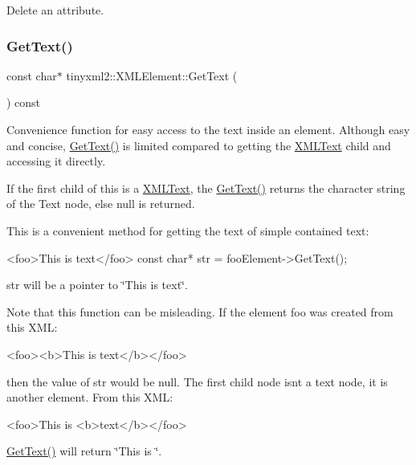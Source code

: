 Delete an attribute. \mbox{\label{classtinyxml2_1_1XMLElement_a6d5c8d115561ade4e4456b71d91b6f51}} 
\subsubsection{\texorpdfstring{GetText()}{GetText()}}
{\footnotesize\ttfamily const char$\ast$ tinyxml2\+::\+X\+M\+L\+Element\+::\+Get\+Text (\begin{DoxyParamCaption}{ }\end{DoxyParamCaption}) const}

Convenience function for easy access to the text inside an element. Although easy and concise, \mbox{\hyperlink{classtinyxml2_1_1XMLElement_a6d5c8d115561ade4e4456b71d91b6f51}{Get\+Text()}} is limited compared to getting the \mbox{\hyperlink{classtinyxml2_1_1XMLText}{X\+M\+L\+Text}} child and accessing it directly.

If the first child of \textquotesingle{}this\textquotesingle{} is a \mbox{\hyperlink{classtinyxml2_1_1XMLText}{X\+M\+L\+Text}}, the \mbox{\hyperlink{classtinyxml2_1_1XMLElement_a6d5c8d115561ade4e4456b71d91b6f51}{Get\+Text()}} returns the character string of the Text node, else null is returned.

This is a convenient method for getting the text of simple contained text\+: \begin{DoxyVerb}<foo>This is text</foo>
    const char* str = fooElement->GetText();
\end{DoxyVerb}


\textquotesingle{}str\textquotesingle{} will be a pointer to \char`\"{}\+This is text\char`\"{}.

Note that this function can be misleading. If the element foo was created from this X\+ML\+: \begin{DoxyVerb}    <foo><b>This is text</b></foo>
\end{DoxyVerb}


then the value of str would be null. The first child node isn\textquotesingle{}t a text node, it is another element. From this X\+ML\+: \begin{DoxyVerb}    <foo>This is <b>text</b></foo>
\end{DoxyVerb}
 \mbox{\hyperlink{classtinyxml2_1_1XMLElement_a6d5c8d115561ade4e4456b71d91b6f51}{Get\+Text()}} will return \char`\"{}\+This is \char`\"{}. \mbox{\label{classtinyxml2_1_1XMLElement_a95a89b13bb14a2d4655e2b5b406c00d4}} 
